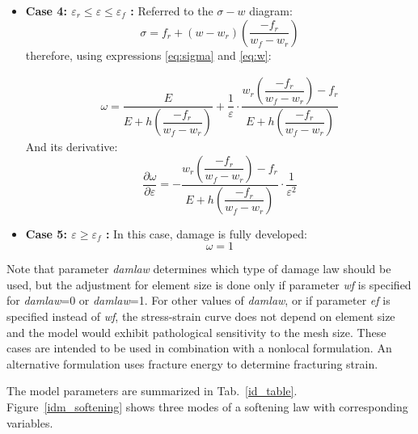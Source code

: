 \documentclass[a4paper]{article}
\begin{document}
\begin{itemize}
\begin{itemize}
	\begin{align*}
	\omega = \dfrac{E}{E + h \left(\dfrac{f_r-f_k}{w_r - w_k}\right) } +\dfrac{1}{\varepsilon} \cdot \dfrac{w_k \left(\dfrac{f_r-f_k}{w_r - w_k}\right) - f_k}{E + h \left(\dfrac{f_r-f_k}{w_r - w_k}\right) } 
	\end{align*}
	And its derivative:
	\[
	\dfrac{\partial \omega}{\partial \varepsilon}=- \dfrac{w_k \left(\dfrac{f_r-f_k}{w_r - w_k}\right) - f_k}{E + h \left(\dfrac{f_r-f_k}{w_r - w_k}\right) } \cdot \dfrac{1}{\varepsilon^2}
	\]
	\item {\bf Case 4: $\varepsilon_r \le \varepsilon \leq \varepsilon_f$ :}
	Referred to the $\sigma-w$ diagram:	
	\[
	\sigma = f_r + (w-w_r) \left(\dfrac{-f_r}{w_f - w_r} \right)
	\]
	therefore, using expressions \eqref{eq:sigma} and \eqref{eq:w}:
	
	\begin{align*}
	\omega = \dfrac{E}{E + h \left(\dfrac{ -f_r}{w_f - w_r} \right) } +\dfrac{1}{\varepsilon} \cdot \dfrac{w_r \left(\dfrac{ -f_r}{w_f - w_r} \right) - f_r}{E + h \left(\dfrac{ -f_r}{w_f - w_r} \right) } 
	\end{align*}
	And its derivative:
	\[
	\dfrac{\partial \omega}{\partial \varepsilon}=- \dfrac{w_r \left(\dfrac{ -f_r}{w_f - w_r} \right) - f_r}{E + h \left(\dfrac{ -f_r}{w_f - w_r} \right) } \cdot \dfrac{1}{\varepsilon^2}
	\]
	\item {\bf Case 5: $\varepsilon \geq \varepsilon_f$ :}
	In this case, damage is fully developed: 
	\[
	\omega=1
	\]
\end{itemize} 
\end{itemize} 

Note that parameter {\it damlaw} determines which type of damage law
should be used, but the adjustment for element size is done only if
parameter {\it wf} is specified for {\it damlaw}=0 or {\it damlaw}=1. 
For other values of {\it damlaw}, or if parameter {\it ef} 
is specified instead of {\it wf}, the stress-strain curve does not depend
on element size and the model would exhibit pathological sensitivity
to the mesh size. These cases are intended to be used in combination
with a nonlocal formulation. An alternative formulation uses fracture energy
to determine fracturing strain.

The model parameters are summarized in Tab.~\ref{id_table}. Figure~\ref{idm_softening} shows
three modes of a softening law with corresponding variables.
\end{document}

